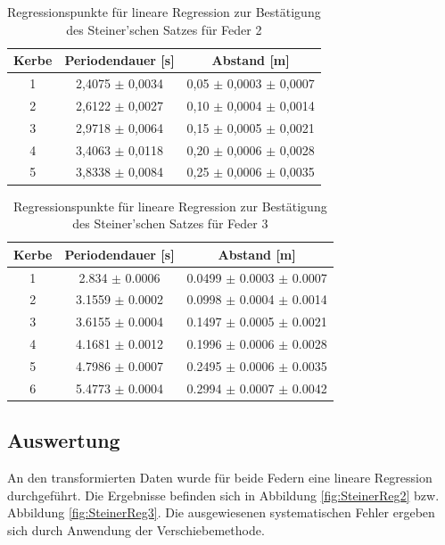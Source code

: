 \documentclass[12pt,a4paper]{article}
\begin{document}
\begin{table}
\caption{Regressionspunkte für lineare Regression zur Bestätigung des Steiner'schen Satzes für Feder 2}
\label{tab:linReg_Punkte_Steiner_Feder2}
\begin{center}
\begin{tabular}{|c|c|c|}
\hline 
Kerbe & Periodendauer [s] & Abstand [m] \\ 
\hline 
1 & 2,4075 $\pm$ 0,0034 & 0,05 $\pm$ 0,0003 $\pm$ 0,0007 \\ 
\hline 
2 & 2,6122 $\pm$ 0,0027 & 0,10 $\pm$ 0,0004 $\pm$ 0,0014 \\ 
\hline 
3 & 2,9718 $\pm$ 0,0064 & 0,15 $\pm$ 0,0005 $\pm$ 0,0021 \\ 
\hline 
4 & 3,4063 $\pm$ 0,0118 & 0,20 $\pm$ 0,0006 $\pm$ 0,0028 \\ 
\hline 
5 & 3,8338 $\pm$ 0,0084 & 0,25 $\pm$ 0,0006 $\pm$ 0,0035 \\ 
\hline 
\end{tabular} 
\end{center}
\end{table}

\begin{table}
\caption{Regressionspunkte für lineare Regression zur Bestätigung des Steiner'schen Satzes für Feder 3}
\label{tab:linReg_Punkte_Steiner_Feder3}
\begin{center}
\begin{tabular}{|c|c|c|}
\hline 
Kerbe & Periodendauer [s] & Abstand [m] \\ 
\hline
1 & 2.834 $\pm$ 0.0006 & 0.0499 $\pm$ 0.0003 $\pm$ 0.0007 \\
\hline
2 & 3.1559 $\pm$ 0.0002 & 0.0998 $\pm$ 0.0004 $\pm$ 0.0014 \\
\hline
3 & 3.6155 $\pm$ 0.0004 & 0.1497 $\pm$ 0.0005 $\pm$ 0.0021 \\
\hline
4 & 4.1681 $\pm$ 0.0012 & 0.1996 $\pm$ 0.0006 $\pm$ 0.0028 \\
\hline
5 & 4.7986 $\pm$ 0.0007 & 0.2495 $\pm$ 0.0006 $\pm$ 0.0035 \\
\hline
6 & 5.4773 $\pm$ 0.0004 & 0.2994 $\pm$ 0.0007 $\pm$ 0.0042 \\
\hline
\end{tabular} 
\end{center}
\end{table}

\subsection{Auswertung}
An den transformierten Daten wurde für beide Federn eine lineare Regression durchgeführt. Die Ergebnisse befinden sich in Abbildung \ref{fig:SteinerReg2} bzw. Abbildung \ref{fig:SteinerReg3}.  Die ausgewiesenen systematischen Fehler ergeben sich durch Anwendung der Verschiebemethode.
\end{document}
